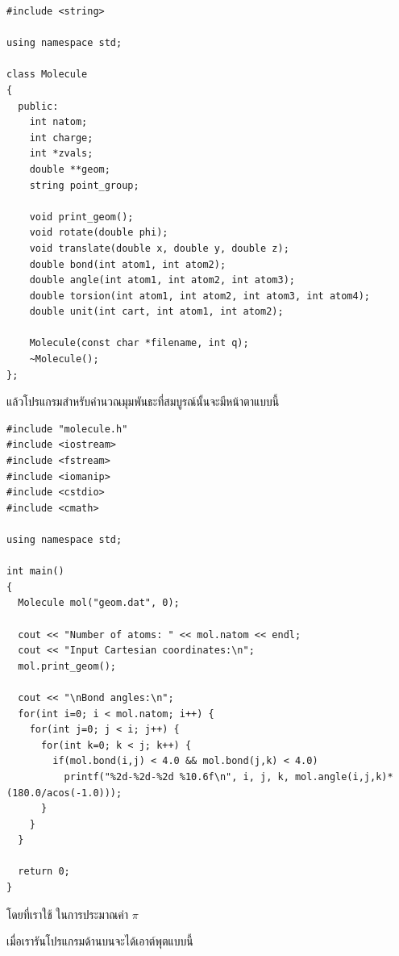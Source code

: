 \vspace{5pt}

\begin{lstlisting}[style=MyC++]
#include <string>

using namespace std;

class Molecule
{
  public:
    int natom;
    int charge;
    int *zvals;
    double **geom;
    string point_group;

    void print_geom();
    void rotate(double phi);
    void translate(double x, double y, double z);
    double bond(int atom1, int atom2);
    double angle(int atom1, int atom2, int atom3);
    double torsion(int atom1, int atom2, int atom3, int atom4);
    double unit(int cart, int atom1, int atom2);

    Molecule(const char *filename, int q);
    ~Molecule();
};
\end{lstlisting}

\vspace{5pt}

แล้วโปรแกรมสำหรับคำนวณมุมพันธะที่สมบูรณ์นั้นจะมีหน้าตาแบบนี้

\vspace{5pt}

\begin{lstlisting}[style=MyC++]
#include "molecule.h"
#include <iostream>
#include <fstream>
#include <iomanip>
#include <cstdio>
#include <cmath>

using namespace std;
  
int main()
{
  Molecule mol("geom.dat", 0);
  
  cout << "Number of atoms: " << mol.natom << endl;
  cout << "Input Cartesian coordinates:\n";
  mol.print_geom();

  cout << "\nBond angles:\n";
  for(int i=0; i < mol.natom; i++) {
    for(int j=0; j < i; j++) {
      for(int k=0; k < j; k++) {
        if(mol.bond(i,j) < 4.0 && mol.bond(j,k) < 4.0)
          printf("%2d-%2d-%2d %10.6f\n", i, j, k, mol.angle(i,j,k)*(180.0/acos(-1.0)));
      }
    }
  }

  return 0;
}
\end{lstlisting}

\vspace{5pt}

\noindent โดยที่เราใช้  ในการประมาณค่า $\pi$

เมื่อเรารันโปรแกรมด้านบนจะได้เอาต์พุตแบบนี้

\vspace{5pt}

